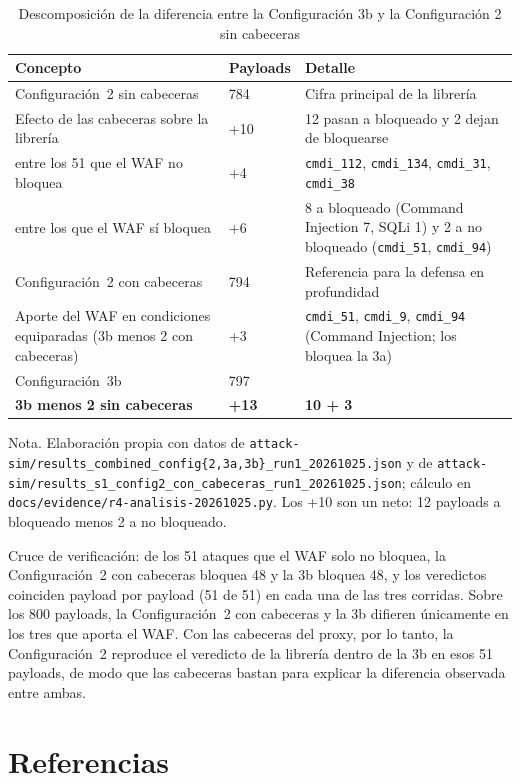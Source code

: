 \begin{table}[H]
\centering
\small
\begin{tabular}{|L{5.2cm}|L{1.6cm}|L{6.3cm}|}
\hline
\textbf{Concepto} & \textbf{Payloads} & \textbf{Detalle} \\ \hline
Configuración~2 sin cabeceras & 784 & Cifra principal de la librería \\ \hline
Efecto de las cabeceras sobre la librería & +10 & 12 pasan a bloqueado y 2 dejan de bloquearse \\ \hline
\hspace{0.4cm}entre los 51 que el WAF no bloquea & +4 & \texttt{cmdi\_112}, \texttt{cmdi\_134}, \texttt{cmdi\_31}, \texttt{cmdi\_38} \\ \hline
\hspace{0.4cm}entre los que el WAF sí bloquea & +6 & 8 a bloqueado (Command Injection 7, SQLi 1) y 2 a no bloqueado (\texttt{cmdi\_51}, \texttt{cmdi\_94}) \\ \hline
Configuración~2 con cabeceras & 794 & Referencia para la defensa en profundidad \\ \hline
Aporte del WAF en condiciones equiparadas (3b menos 2 con cabeceras) & +3 & \texttt{cmdi\_51}, \texttt{cmdi\_9}, \texttt{cmdi\_94} (Command Injection; los bloquea la 3a) \\ \hline
Configuración~3b & 797 & \\ \hline
\textbf{3b menos 2 sin cabeceras} & \textbf{+13} & \textbf{10 + 3} \\ \hline
\end{tabular}
\caption[Descomposición del aporte de la combinación]{Descomposición de la diferencia entre la Configuración 3b y la Configuración 2 sin cabeceras}
\label{tab:anx-descomposicion}
\end{table}
{\footnotesize Nota. Elaboración propia con datos de
\texttt{attack-sim/results\_combined\_config\{2,3a,3b\}\_run1\_20261025.json} y de
\texttt{attack-sim/results\_s1\_config2\_con\_cabeceras\_run1\_20261025.json}; cálculo en
\texttt{docs/evidence/r4-analisis-20261025.py}. Los +10 son un neto: 12 payloads a bloqueado menos 2
a no bloqueado.}

Cruce de verificación: de los 51 ataques que el WAF solo no bloquea, la Configuración~2 con
cabeceras bloquea 48 y la 3b bloquea 48, y los veredictos coinciden payload por payload (51 de 51)
en cada una de las tres corridas. Sobre los 800 payloads, la Configuración~2 con cabeceras y la 3b
difieren únicamente en los tres que aporta el WAF. Con las cabeceras del proxy, por lo tanto, la
Configuración~2 reproduce el veredicto de la librería dentro de la 3b en esos 51 payloads, de modo
que las cabeceras bastan para explicar la diferencia observada entre ambas.

\ifdefined\modoensamble
\else
	\section*{Referencias}
	\printbibliography[heading=none]
	
\fi
